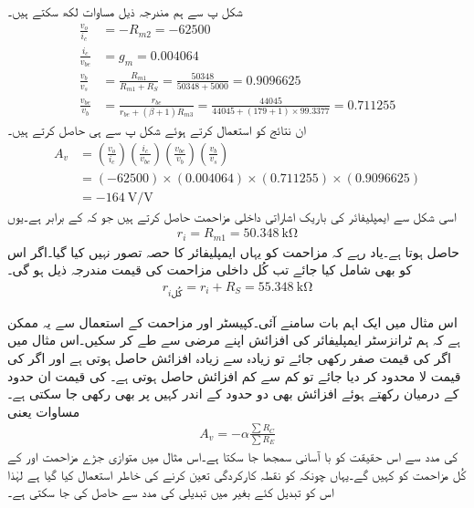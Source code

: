 شکل  پ سے ہم مندرجہ ذیل مساوات لکھ سکتے ہیں۔
\begin{align*}
\frac{v_o}{i_c}&=-R_{m2}=-62500\\
\frac{i_c}{v_{be}}&=g_m=0.004064 \\
\frac{v_b}{v_s}&=\frac{R_{m1}}{R_{m1}+R_S}=\frac{50348}{50348+5000}=0.9096625\\
\frac{v_{be}}{v_b}&=\frac{r_{be}}{r_{be}+(\beta+1)R_{m3}}=\frac{44045}{44045+(179+1) \times 99.3377}=0.711255
\end{align*}
ان نتائج کو استعمال کرتے ہوئے شکل  پ سے ہی  حاصل کرتے ہیں۔
\begin{align*}
A_v &=\left(\frac{v_o}{i_c} \right ) \left(\frac{i_c}{v_{be}} \right ) \left(\frac{v_{be}}{v_b} \right ) \left(\frac{v_b}{v_s} \right )\\
&=(-62500) \times (0.004064) \times (0.711255) \times (0.9096625)\\
&=\SI{-164}{\volt \per \volt}
\end{align*}
اسی شکل سے ایمپلیفائر کی باریک اشاراتی داخلی مزاحمت حاصل کرتے ہیں جو کہ  کے برابر ہے۔یوں
\begin{align*}
r_i=R_{m1}=\SI{50.348}{\kilo \ohm}
\end{align*}
حاصل ہوتا ہے۔یاد رہے کہ مزاحمت  کو یہاں ایمپلیفائر کا حصہ تصور نہیں کیا گیا۔اگر اس کو بھی شامل کیا جائے تب کُل داخلی مزاحمت کی قیمت مندرجہ ذیل ہو گی۔
\begin{align*}
r_{i\text{کُل}}=r_i+R_S=\SI{55.348}{\kilo \ohm}
\end{align*}

اس مثال میں ایک اہم بات سامنے آئی۔کپیسٹر  اور مزاحمت  کے استعمال سے یہ ممکن ہے کہ ہم ٹرانزسٹر ایمپلیفائر کی افزائش اپنے مرضی سے طے کر سکیں۔اس مثال میں اگر  کی قیمت صفر رکھی جائے تو زیادہ سے زیادہ افزائش حاصل ہوتی ہے اور اگر   کی قیمت لا محدود کر دیا جائے تو کم سے کم افزائش حاصل ہوتی ہے۔  کی قیمت ان حدود کے درمیان رکھتے ہوئے افزائش بھی دو حدود کے اندر کہیں پر بھی رکھی جا سکتی ہے۔مساوات   یعنی
\begin{align*}
A_v= -\alpha \frac{\sum R_C}{\sum R_E}
\end{align*}
کی مدد سے اس حقیقت کو با آسانی سمجھا جا سکتا ہے۔اس مثال میں متوازی جڑے مزاحمت  اور  کے کُل مزاحمت کو  کہیں گے۔یہاں چونکہ   کو نقطہ کارکردگی تعین کرنے کی خاطر استعمال کیا گیا ہے لہٰذا اس کو تبدیل کئے بغیر  میں تبدیلی  کی مدد سے حاصل کی جا سکتی ہے۔

